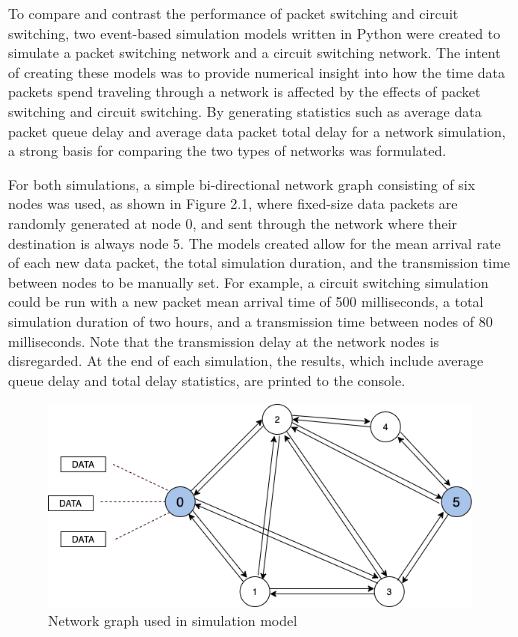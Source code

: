 \documentclass{article}
\begin{document}
  To compare and contrast the performance of packet switching and circuit switching, two event-based simulation models
  written in Python were created to simulate a packet switching network and a circuit switching network. The intent of
  creating these models was to provide numerical insight into how the time data packets spend traveling through a network
  is affected by the effects of packet switching and circuit switching. By generating statistics such as average data packet
  queue delay and average data packet total delay for a network simulation, a strong basis for comparing the two types of
  networks was formulated.

  For both simulations, a simple bi-directional network graph consisting of six nodes was used, as shown in Figure 2.1, where fixed-size data packets
  are randomly generated at node 0, and sent through the network where their destination is always node 5. The models
  created allow for the mean arrival rate of each new data packet, the total simulation duration, and the transmission time
  between nodes to be manually set. For example, a circuit switching simulation could be run with a new packet mean arrival time of 500 milliseconds, a
  total simulation duration of two hours, and a transmission time between nodes of 80 milliseconds. Note that the transmission delay
  at the network nodes is disregarded. At the end of each simulation, the results, which include average queue delay and total delay statistics, are printed to the console.

  \begin{figure}[h]
  \centering
          \includegraphics[totalheight=6cm]{images/network_graph.png}
  \renewcommand\figurename{Figure}
      \caption{Network graph used in simulation model}
      \label{fig:networkgraph}
  \end{figure}
\end{document}
